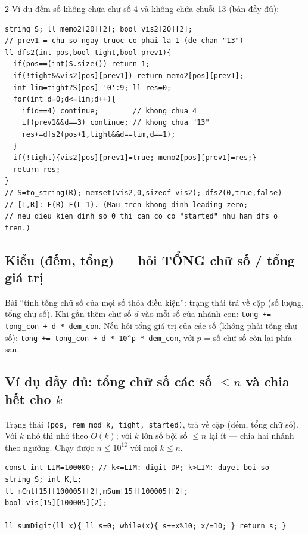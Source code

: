 \documentclass[8pt]{extarticle}
\begin{document}
\begin{multicols}{2}
Ví dụ đếm số không chứa chữ số 4 và không chứa chuỗi 13 (bản đầy đủ):
\begin{lstlisting}
string S; ll memo2[20][2]; bool vis2[20][2];
// prev1 = chu so ngay truoc co phai la 1 (de chan "13")
ll dfs2(int pos,bool tight,bool prev1){
  if(pos==(int)S.size()) return 1;
  if(!tight&&vis2[pos][prev1]) return memo2[pos][prev1];
  int lim=tight?S[pos]-'0':9; ll res=0;
  for(int d=0;d<=lim;d++){
    if(d==4) continue;        // khong chua 4
    if(prev1&&d==3) continue; // khong chua "13"
    res+=dfs2(pos+1,tight&&d==lim,d==1);
  }
  if(!tight){vis2[pos][prev1]=true; memo2[pos][prev1]=res;}
  return res;
}
// S=to_string(R); memset(vis2,0,sizeof vis2); dfs2(0,true,false)
// [L,R]: F(R)-F(L-1). (Mau tren khong dinh leading zero;
// neu dieu kien dinh so 0 thi can co co "started" nhu ham dfs o tren.)
\end{lstlisting}

\subsection{Kiểu (đếm, tổng) --- hỏi TỔNG chữ số / tổng giá trị}
Bài ``tính tổng chữ số của mọi số thỏa điều kiện'': trạng thái trả về cặp (số lượng, tổng chữ số). Khi gắn thêm chữ số $d$ vào mỗi số của nhánh con: \texttt{tong += tong\_con + d * dem\_con}. Nếu hỏi tổng giá trị của các số (không phải tổng chữ số): \texttt{tong += tong\_con + d * 10\^{}p * dem\_con}, với $p$ = số chữ số còn lại phía sau.

\subsection{Ví dụ đầy đủ: tổng chữ số các số $\le n$ và chia hết cho $k$}
Trạng thái \texttt{(pos, rem mod k, tight, started)}, trả về cặp (đếm, tổng chữ số). Với $k$ nhỏ thì nhớ theo $O(k)$; với $k$ lớn số bội số $\le n$ lại ít --- chia hai nhánh theo ngưỡng. Chạy được $n\le 10^{12}$ với mọi $k\le n$.
\begin{lstlisting}
const int LIM=100000; // k<=LIM: digit DP; k>LIM: duyet boi so
string S; int K,L;
ll mCnt[15][100005][2],mSum[15][100005][2];
bool vis[15][100005][2];

ll sumDigit(ll x){ ll s=0; while(x){ s+=x%10; x/=10; } return s; }


\end{lstlisting}
\end{multicols}
\end{document}
